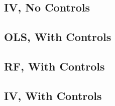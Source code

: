 \documentclass{article}
\begin{document}
\begin{landscape}
\subsection{IV, No Controls}

\clearpage

\subsection{OLS, With Controls}

\clearpage
\subsection{RF, With Controls}

\clearpage
\subsection{IV, With Controls}

\clearpage


\clearpage

\clearpage
%
%
%
%
%
%
%
%
%

\end{landscape}
\end{document}
